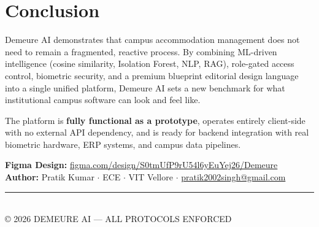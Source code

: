 \documentclass[12pt, a4paper]{article}
\begin{document}
\vspace{16pt}

\section{Conclusion}

Demeure AI demonstrates that campus accommodation management does not need to remain a fragmented, reactive process. By combining ML-driven intelligence (cosine similarity, Isolation Forest, NLP, RAG), role-gated access control, biometric security, and a premium blueprint editorial design language into a single unified platform, Demeure AI sets a new benchmark for what institutional campus software can look and feel like.

The platform is \textbf{fully functional as a prototype}, operates entirely client-side with no external API dependency, and is ready for backend integration with real biometric hardware, ERP systems, and campus data pipelines.

\vspace{10pt}

\begin{tcolorbox}[uspbox, title={\bfseries\small Links}]
\textbf{Figma Design:} \href{https://www.figma.com/design/S0tmUfP9rU54l6yEuYej26/Demeure?node-id=150-41&t=PNxVdy8J1NUSipBh-1}{\ttfamily figma.com/design/S0tmUfP9rU54l6yEuYej26/Demeure}\\
\textbf{Author:} Pratik Kumar $\cdot$ ECE $\cdot$ VIT Vellore $\cdot$ \href{mailto:pratik2002singh@gmail.com}{\ttfamily pratik2002singh@gmail.com}
\end{tcolorbox}

\vspace{30pt}

\begin{center}
{\color{dnavy}\rule{0.5\linewidth}{0.5pt}}\\[8pt]
{\small\color{dslate}\ttfamily © 2026 DEMEURE AI — ALL PROTOCOLS ENFORCED}
\end{center}
\end{document}
